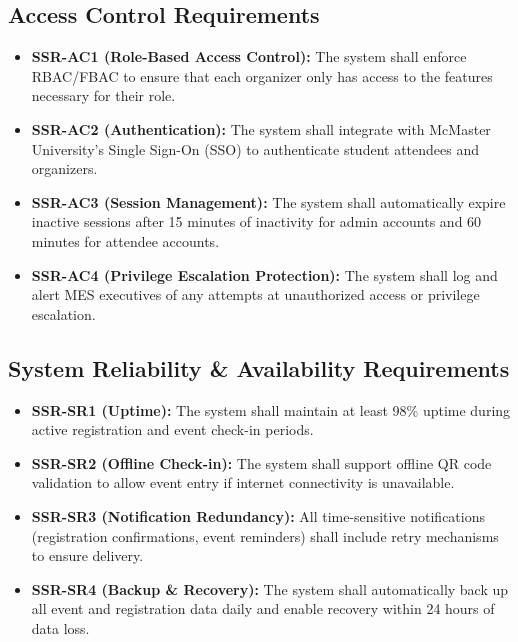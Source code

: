 \documentclass{article}
\begin{document}
\subsection{Access Control Requirements}
\begin{itemize}
    \item \textbf{SSR-AC1 (Role-Based Access Control):} The system shall enforce RBAC/FBAC to ensure that each organizer only has access to the features necessary for their role.
    \item \textbf{SSR-AC2 (Authentication):} The system shall integrate with McMaster University's Single Sign-On (SSO) to authenticate student attendees and organizers.
    \item \textbf{SSR-AC3 (Session Management):} The system shall automatically expire inactive sessions after 15 minutes of inactivity for admin accounts and 60 minutes for attendee accounts.
    \item \textbf{SSR-AC4 (Privilege Escalation Protection):} The system shall log and alert MES executives of any attempts at unauthorized access or privilege escalation.
\end{itemize}

\subsection{System Reliability \& Availability Requirements}
\begin{itemize}
    \item \textbf{SSR-SR1 (Uptime):} The system shall maintain at least 98\% uptime during active registration and event check-in periods.
    \item \textbf{SSR-SR2 (Offline Check-in):} The system shall support offline QR code validation to allow event entry if internet connectivity is unavailable.
    \item \textbf{SSR-SR3 (Notification Redundancy):} All time-sensitive notifications (registration confirmations, event reminders) shall include retry mechanisms to ensure delivery.
    \item \textbf{SSR-SR4 (Backup \& Recovery):} The system shall automatically back up all event and registration data daily and enable recovery within 24 hours of data loss.
\end{itemize}
\end{document}
